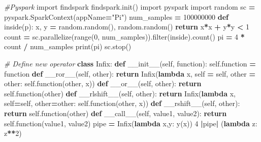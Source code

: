 \documentclass[]{book}
\newenvironment{Shaded}{\begin{snugshade}}{\end{snugshade}}
\newcommand{\KeywordTok}[1]{\textcolor[rgb]{0.13,0.29,0.53}{\textbf{#1}}}
\newcommand{\DecValTok}[1]{\textcolor[rgb]{0.00,0.00,0.81}{#1}}
\newcommand{\StringTok}[1]{\textcolor[rgb]{0.31,0.60,0.02}{#1}}
\newcommand{\ImportTok}[1]{#1}
\newcommand{\CommentTok}[1]{\textcolor[rgb]{0.56,0.35,0.01}{\textit{#1}}}
\newcommand{\FunctionTok}[1]{\textcolor[rgb]{0.00,0.00,0.00}{#1}}
\newcommand{\VariableTok}[1]{\textcolor[rgb]{0.00,0.00,0.00}{#1}}
\newcommand{\ControlFlowTok}[1]{\textcolor[rgb]{0.13,0.29,0.53}{\textbf{#1}}}
\newcommand{\OperatorTok}[1]{\textcolor[rgb]{0.81,0.36,0.00}{\textbf{#1}}}
\newcommand{\BuiltInTok}[1]{#1}
\newcommand{\NormalTok}[1]{#1}
\theoremstyle{definition}
\theoremstyle{definition}
\theoremstyle{definition}
\theoremstyle{remark}
\begin{document}
\begin{Shaded}
\begin{Highlighting}[]
\CommentTok{#Pyspark}
\ImportTok{import}\NormalTok{ findspark}
\NormalTok{findspark.init()}
\ImportTok{import}\NormalTok{ pyspark}
\ImportTok{import}\NormalTok{ random}
\NormalTok{sc }\OperatorTok{=}\NormalTok{ pyspark.SparkContext(appName}\OperatorTok{=}\StringTok{"Pi"}\NormalTok{)}
\NormalTok{num_samples }\OperatorTok{=} \DecValTok{100000000}
\KeywordTok{def}\NormalTok{ inside(p):     }
\NormalTok{    x, y }\OperatorTok{=}\NormalTok{ random.random(), random.random()}
    \ControlFlowTok{return}\NormalTok{ x}\OperatorTok{*}\NormalTok{x }\OperatorTok{+}\NormalTok{ y}\OperatorTok{*}\NormalTok{y }\OperatorTok{<} \DecValTok{1}
\NormalTok{count }\OperatorTok{=}\NormalTok{ sc.parallelize(}\BuiltInTok{range}\NormalTok{(}\DecValTok{0}\NormalTok{, num_samples)).}\BuiltInTok{filter}\NormalTok{(inside).count()}
\NormalTok{pi }\OperatorTok{=} \DecValTok{4} \OperatorTok{*}\NormalTok{ count }\OperatorTok{/}\NormalTok{ num_samples}
\BuiltInTok{print}\NormalTok{(pi)}
\NormalTok{sc.stop()}
\end{Highlighting}
\end{Shaded}

\begin{Shaded}
\begin{Highlighting}[]
\CommentTok{# Define new operator}
\KeywordTok{class}\NormalTok{ Infix:}
    \KeywordTok{def} \FunctionTok{__init__}\NormalTok{(}\VariableTok{self}\NormalTok{, function):}
        \VariableTok{self}\NormalTok{.function }\OperatorTok{=}\NormalTok{ function}
    \KeywordTok{def} \FunctionTok{__ror__}\NormalTok{(}\VariableTok{self}\NormalTok{, other):}
        \ControlFlowTok{return}\NormalTok{ Infix(}\KeywordTok{lambda}\NormalTok{ x, }\VariableTok{self} \OperatorTok{=} \VariableTok{self}\NormalTok{, other }\OperatorTok{=}\NormalTok{ other: }\VariableTok{self}\NormalTok{.function(other, x))}
    \KeywordTok{def} \FunctionTok{__or__}\NormalTok{(}\VariableTok{self}\NormalTok{, other):}
        \ControlFlowTok{return} \VariableTok{self}\NormalTok{.function(other)}
    \KeywordTok{def} \FunctionTok{__rlshift__}\NormalTok{(}\VariableTok{self}\NormalTok{, other):}
        \ControlFlowTok{return}\NormalTok{ Infix(}\KeywordTok{lambda}\NormalTok{ x, }\VariableTok{self}\OperatorTok{=}\VariableTok{self}\NormalTok{, other}\OperatorTok{=}\NormalTok{other: }\VariableTok{self}\NormalTok{.function(other, x))}
    \KeywordTok{def} \FunctionTok{__rshift__}\NormalTok{(}\VariableTok{self}\NormalTok{, other):}
        \ControlFlowTok{return} \VariableTok{self}\NormalTok{.function(other)}
    \KeywordTok{def} \FunctionTok{__call__}\NormalTok{(}\VariableTok{self}\NormalTok{, value1, value2):}
        \ControlFlowTok{return} \VariableTok{self}\NormalTok{.function(value1, value2)}
\NormalTok{pipe }\OperatorTok{=}\NormalTok{ Infix(}\KeywordTok{lambda}\NormalTok{ x,y: y(x))}
\DecValTok{4} \OperatorTok{|}\NormalTok{pipe}\OperatorTok{|}\NormalTok{ (}\KeywordTok{lambda}\NormalTok{ z: z}\OperatorTok{**}\DecValTok{2}\NormalTok{)}
\end{Highlighting}
\end{Shaded}
\end{document}
